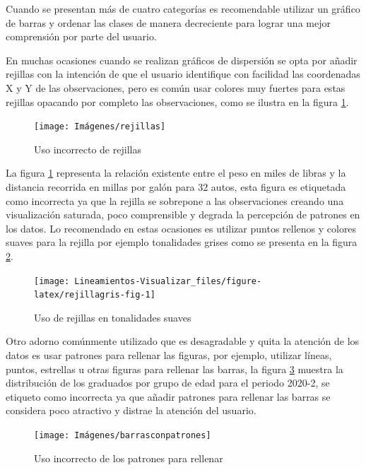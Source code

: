 \documentclass[
]{book}
\begin{document}
Cuando se presentan más de cuatro categorías es recomendable utilizar un gráfico de barras y ordenar las clases de manera decreciente para lograr una mejor comprensión por parte del usuario.

En muchas ocasiones cuando se realizan gráficos de dispersión se opta por añadir rejillas con la intención de que el usuario identifique con facilidad las coordenadas X y Y de las observaciones, pero es común usar colores muy fuertes para estas rejillas opacando por completo las observaciones, como se ilustra en la figura \ref{fig:usoderejillas-fig}.

\begin{figure}

{\centering \texttt{[image: Imágenes/rejillas]} 

}

\caption{Uso incorrecto de rejillas}\label{fig:usoderejillas-fig}
\end{figure}

La figura \ref{fig:usoderejillas-fig} representa la relación existente entre el peso en miles de libras y la distancia recorrida en millas por galón para 32 autos, esta figura es etiquetada como incorrecta ya que la rejilla se sobrepone a las observaciones creando una visualización saturada, poco comprensible y degrada la percepción de patrones en los datos. Lo recomendado en estas ocasiones es utilizar puntos rellenos y colores suaves para la rejilla por ejemplo tonalidades grises como se presenta en la figura \ref{fig:rejillagris-fig}.

\begin{figure}

{\centering \texttt{[image: Lineamientos-Visualizar\_files/figure-latex/rejillagris-fig-1]} 

}

\caption{Uso de rejillas en tonalidades suaves}\label{fig:rejillagris-fig}
\end{figure}

Otro adorno comúnmente utilizado que es desagradable y quita la atención de los datos es usar patrones para rellenar las figuras, por ejemplo, utilizar líneas, puntos, estrellas u otras figuras para rellenar las barras, la figura \ref{fig:barrasconpatrones-fig} muestra la distribución de los graduados por grupo de edad para el periodo 2020-2, se etiqueto como incorrecta ya que añadir patrones para rellenar las barras se considera poco atractivo y distrae la atención del usuario.

\begin{figure}

{\centering \texttt{[image: Imágenes/barrasconpatrones]} 

}

\caption{Uso incorrecto de los patrones para rellenar}\label{fig:barrasconpatrones-fig}
\end{figure}
\end{document}
